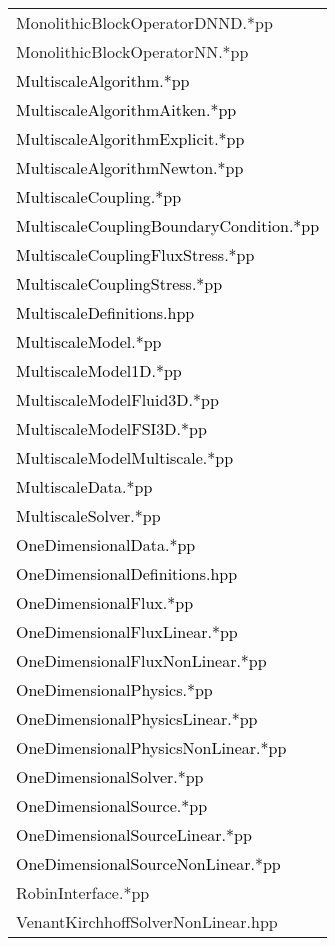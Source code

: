 \documentclass[10p]{article}
\newcommand{\newpartsVC}[1]{\textcolor{black}{#1}}
\theoremstyle{definition}
\begin{document}
\begin{landscape}
\begin{table}[!h]
\begin{multicols}{3}
\begin{xtabular}{
p{0.36\textwidth}<{}
}
MonolithicBlockOperatorDNND.*pp\\
MonolithicBlockOperatorNN.*pp\\
\newpartsVC{MultiscaleAlgorithm.*pp}\\
\newpartsVC{MultiscaleAlgorithmAitken.*pp}\\
\newpartsVC{MultiscaleAlgorithmExplicit.*pp}\\
\newpartsVC{MultiscaleAlgorithmNewton.*pp}\\
\newpartsVC{MultiscaleCoupling.*pp}\\
\newpartsVC{MultiscaleCouplingBoundaryCondition.*pp}\\
\newpartsVC{MultiscaleCouplingFluxStress.*pp}\\
\newpartsVC{MultiscaleCouplingStress.*pp}\\
\newpartsVC{MultiscaleDefinitions.hpp}\\
\newpartsVC{MultiscaleModel.*pp}\\
\newpartsVC{MultiscaleModel1D.*pp}\\
\newpartsVC{MultiscaleModelFluid3D.*pp}\\
\newpartsVC{MultiscaleModelFSI3D.*pp}\\
\newpartsVC{MultiscaleModelMultiscale.*pp}\\
\newpartsVC{MultiscaleData.*pp}\\
\newpartsVC{MultiscaleSolver.*pp}\\
\newpartsVC{OneDimensionalData.*pp}\\
\newpartsVC{OneDimensionalDefinitions.hpp}\\
\newpartsVC{OneDimensionalFlux.*pp}\\
\newpartsVC{OneDimensionalFluxLinear.*pp}\\
\newpartsVC{OneDimensionalFluxNonLinear.*pp}\\
\newpartsVC{OneDimensionalPhysics.*pp}\\
\newpartsVC{OneDimensionalPhysicsLinear.*pp}\\
\newpartsVC{OneDimensionalPhysicsNonLinear.*pp}\\
\newpartsVC{OneDimensionalSolver.*pp}\\
\newpartsVC{OneDimensionalSource.*pp}\\
\newpartsVC{OneDimensionalSourceLinear.*pp}\\
\newpartsVC{OneDimensionalSourceNonLinear.*pp}\\
RobinInterface.*pp\\
VenantKirchhoffSolverNonLinear.hpp \\

\end{xtabular}
\end{multicols}
\end{table}
\end{landscape}
\end{document}
